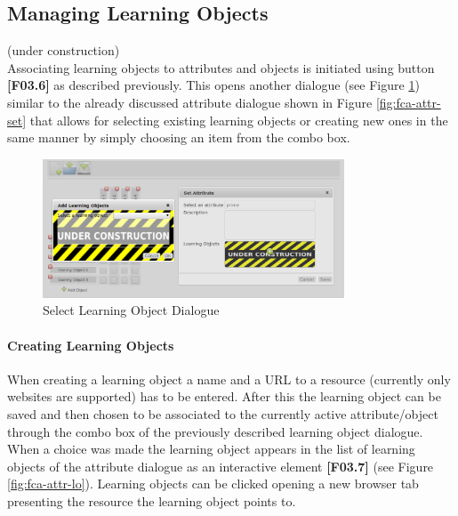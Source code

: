 \documentclass[a4paper,11pt]{article}
\begin{document}
\subsection{Managing Learning Objects}
(under construction)\\
Associating learning objects to attributes and objects is initiated using button \textbf{[F03.6]} as described previously. This opens another dialogue (see Figure \ref{fig:fca-lo-sel}) similar to the already discussed attribute dialogue shown in Figure \ref{fig:fca-attr-set} that allows for selecting existing learning objects or creating new ones in the same manner by simply choosing an item from the combo box.
\begin{figure}[h]
\begin{center}
\includegraphics[width=0.8\textwidth]{figures/lo_sel}  
\end{center}
\caption{Select Learning Object Dialogue}
\label{fig:fca-lo-sel}
\end{figure}
\paragraph*{Creating Learning Objects\\}
When creating a learning object a name and a URL to a resource (currently only websites are supported) has to be entered. After this the learning object can be saved and then chosen to be associated to the currently active attribute/object through the combo box of the previously described learning object dialogue. When a choice was made the learning object appears in the list of learning objects of the attribute dialogue as an interactive element \textbf{[F03.7]} (see Figure \ref{fig:fca-attr-lo}). Learning objects can be clicked opening a new browser tab presenting the resource the learning object points to.
\end{document}
